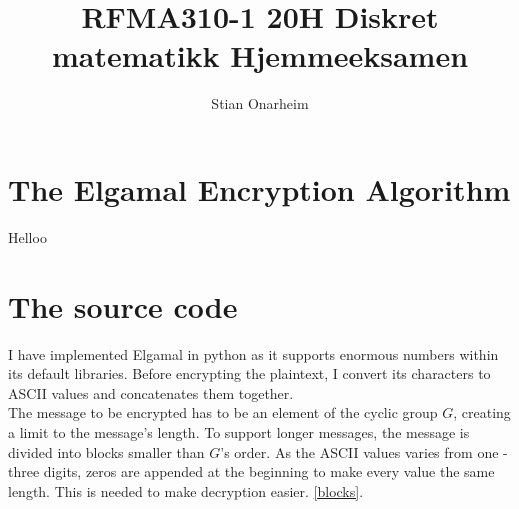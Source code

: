 \documentclass{article}
\author{Stian Onarheim}
\title{RFMA310-1 20H Diskret matematikk Hjemmeeksamen}
\begin{document}
\maketitle
\newpage
\tableofcontents
\newpage

\section{The Elgamal Encryption Algorithm}
Helloo

\section{The source code}
I have implemented Elgamal in python as it supports enormous numbers within its default libraries. Before encrypting the plaintext, I convert its characters to ASCII values and concatenates them together.\\

The message to be encrypted has to be an element of the cyclic group $G$, creating a limit to the message's length. To support longer messages, the message is divided into blocks smaller than $G$'s order. As the ASCII values varies from one - three digits, zeros are appended at the beginning to make every value the same length. This is needed to make decryption easier. \ref{blocks}.
\end{document}
